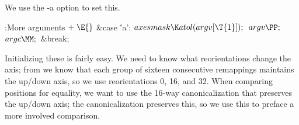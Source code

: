 We use the -a option to set this.

\Y\B\4:More arguments\X${}\mathrel+\E{}$\6
\4\&{case} \.{'a'}:\5
${}\\{axesmask}\K\\{atol}(\\{argv}[\T{1}]);{}$\6
${}\\{argv}\PP;{}$\6
${}\\{argc}\MM;{}$\6
\&{break};\par
\fi

Initializing these is fairly easy.  We need to know what
reorientations change the axis; from  we know that each group
of sixteen consecutive remappings maintains the up/down axis, so we
use reorientations 0, 16, and 32.  When comparing positions for
equality, we want to use the 16-way canonicalization that preserves
the up/down axis; the  canonicalization preserves this, so
we use this to preface a more involved comparison.

